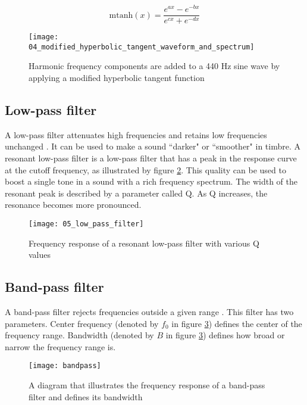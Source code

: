 $$\text{mtanh}(x)=\frac{e^{ax}-e^{-bx}}{e^{cx}+e^{-dx}}$$

\begin{figure}[H]
    \centering
    \texttt{[image: 04\_modified\_hyperbolic\_tangent\_waveform\_and\_spectrum]}
    \caption{Harmonic frequency components are added to a 440 Hz sine wave by applying a modified hyperbolic tangent function}
    \label{fig:modified_hyperbolic_tangent_waveform_and_spectrum}
\end{figure}

\subsection{Low-pass filter}
A low-pass filter attenuates high frequencies and retains low frequencies unchanged \citep{dodge_jerse_1997}. It can be used to make a sound ``darker" or ``smoother" in timbre. A resonant low-pass filter is a low-pass filter that has a peak in the response curve at the cutoff frequency, as illustrated by figure \ref{fig:low_pass_filter}. This quality can be used to boost a single tone in a sound with a rich frequency spectrum. The width of the resonant peak is described by a parameter called Q. As Q increases, the resonance becomes more pronounced.

\begin{figure}[H]
    \centering
    \texttt{[image: 05\_low\_pass\_filter]}
    \caption{Frequency response of a resonant low-pass filter with various Q values}
    \label{fig:low_pass_filter}
\end{figure}

\subsection{Band-pass filter}
A band-pass filter rejects frequencies outside a given range \citep{dodge_jerse_1997}. This filter has two parameters. Center frequency (denoted by $f_0$ in figure \ref{fig:bandpass}) defines the center of the frequency range. Bandwidth (denoted by $B$ in figure \ref{fig:bandpass}) defines how broad or narrow the frequency range is.

\begin{figure}[H]
    \centering
    \texttt{[image: bandpass]}
    \caption{A diagram that illustrates the frequency response of a band-pass filter and defines its bandwidth}
    \label{fig:bandpass}
\end{figure}

